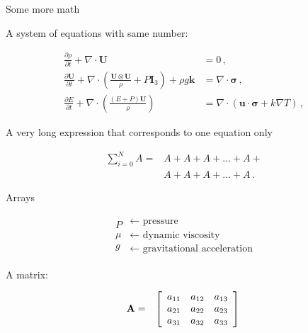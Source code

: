 \documentclass[aspectratio=169,mathserif,10pt]{beamer}
\newcommand{\newslide}[2]
{\begin{frame}{#1}
\begin{center}
{#2}
\end{center}
\end{frame}}
\begin{document}
\begin{frame}{Some more math}
\vspace{-.3cm}

A system of equations with same number:

{\small
    \begin{subequations}\label{NSEqns}
        \begin{align}
        \frac{\partial \rho}{\partial t} + \nabla \cdot \boldsymbol{U} &= 0 \, ,\\
        \frac{\partial \boldsymbol{U}}{\partial t} + \nabla \cdot \left( \frac{\boldsymbol{U} \otimes \boldsymbol{U}}{\rho} + P \mathbf{I}_3 \right) + \rho g \boldsymbol{k} &= \nabla \cdot \boldsymbol{\sigma} \, ,\\
        \frac{\partial E}{\partial t} + \nabla \cdot \left( \frac{(E + P)\boldsymbol{U}}{\rho} \right) &= \nabla \cdot \left(  \boldsymbol{u}  \cdot \boldsymbol{\sigma}  + k \nabla T\right)\, ,
        \end{align}
    \end{subequations}
}


A very long expression that corresponds to one equation only

\begin{minipage}{0.48\textwidth}
\begin{align}
\sum_{i=0}^{N} A =& A + A + A + \ldots + A + \nonumber \\
                  & A + A + A + \ldots + A \,.
\end{align}
\end{minipage}

\end{frame}

\newslide{Arrays}{

\begin{align*}
    \begin{array}{r}
        P \\
        \mu \\
        g 
    \end{array}
    \begin{array}{l}
        \leftarrow\textrm{ pressure}\\
        \leftarrow\textrm{ dynamic viscosity}\\
        \leftarrow\textrm{ gravitational acceleration}
    \end{array}
\end{align*}

A matrix: 

\begin{align}
    \begin{array}{rl}
        \mathbf{A} = &
        \left[
        \begin{array}{c c c}
            a_{11} & a_{12} & a_{13} \\
            a_{21} & a_{22} & a_{23} \\
            a_{31} & a_{32} & a_{33}
        \end{array}
        \right]
    \end{array} \,
\end{align}

}
\end{document}
